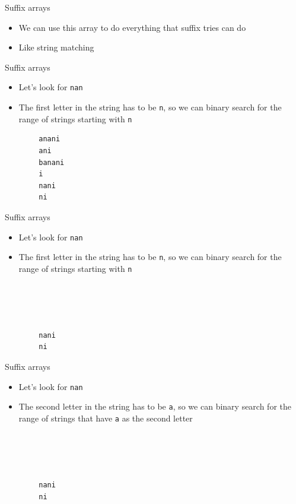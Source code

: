 \documentclass{beamer}
\begin{document}
\begin{frame}[fragile]{Suffix arrays}
	\begin{itemize}
		\item We can use this array to do everything that suffix tries can do
		\vspace{10pt}
		\item Like string matching
	\end{itemize}
\end{frame}

\begin{frame}[fragile]{Suffix arrays}
	\begin{itemize}
		\item Let's look for \texttt{nan}
		\item<2-> The first letter in the string has to be \texttt{n}, so we can binary search for the range of strings starting with \texttt{n}
	\end{itemize}
	\vspace{10pt}
	\begin{verbatim}
		anani
		ani
		banani
		i
		nani
		ni
	\end{verbatim}
\end{frame}

\begin{frame}[fragile]{Suffix arrays}
	\begin{itemize}
		\item Let's look for \texttt{nan}
		\item The first letter in the string has to be \texttt{n}, so we can binary search for the range of strings starting with \texttt{n}
	\end{itemize}
	\vspace{10pt}
	\begin{verbatim}
		
		
		
		
		nani
		ni
	\end{verbatim}
\end{frame}

\begin{frame}[fragile]{Suffix arrays}
	\begin{itemize}
		\item Let's look for \texttt{nan}
		\item The second letter in the string has to be \texttt{a}, so we can binary search for the range of strings that have \texttt{a} as the second letter
	\end{itemize}
	\vspace{10pt}
	\begin{verbatim}
		
		
		
		
		nani
		ni
	\end{verbatim}
\end{frame}
\end{document}
